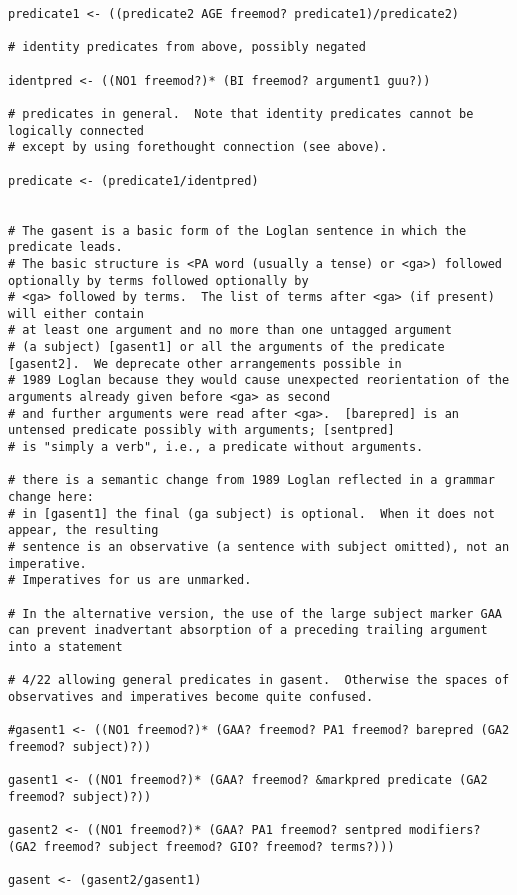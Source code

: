 \documentclass[12pt]{book}
\begin{document}
{\begin{verbatim}
predicate1 <- ((predicate2 AGE freemod? predicate1)/predicate2)

# identity predicates from above, possibly negated

identpred <- ((NO1 freemod?)* (BI freemod? argument1 guu?))

# predicates in general.  Note that identity predicates cannot be logically connected
# except by using forethought connection (see above).

predicate <- (predicate1/identpred)


# The gasent is a basic form of the Loglan sentence in which the predicate leads.
# The basic structure is <PA word (usually a tense) or <ga>) followed optionally by terms followed optionally by
# <ga> followed by terms.  The list of terms after <ga> (if present) will either contain 
# at least one argument and no more than one untagged argument
# (a subject) [gasent1] or all the arguments of the predicate [gasent2].  We deprecate other arrangements possible in
# 1989 Loglan because they would cause unexpected reorientation of the arguments already given before <ga> as second
# and further arguments were read after <ga>.  [barepred] is an untensed predicate possibly with arguments; [sentpred]
# is "simply a verb", i.e., a predicate without arguments.

# there is a semantic change from 1989 Loglan reflected in a grammar change here:
# in [gasent1] the final (ga subject) is optional.  When it does not appear, the resulting
# sentence is an observative (a sentence with subject omitted), not an imperative.
# Imperatives for us are unmarked.

# In the alternative version, the use of the large subject marker GAA can prevent inadvertant absorption of a preceding trailing argument into a statement

# 4/22 allowing general predicates in gasent.  Otherwise the spaces of observatives and imperatives become quite confused.

#gasent1 <- ((NO1 freemod?)* (GAA? freemod? PA1 freemod? barepred (GA2 freemod? subject)?))

gasent1 <- ((NO1 freemod?)* (GAA? freemod? &markpred predicate (GA2 freemod? subject)?))

gasent2 <- ((NO1 freemod?)* (GAA? PA1 freemod? sentpred modifiers? (GA2 freemod? subject freemod? GIO? freemod? terms?)))

gasent <- (gasent2/gasent1)


\end{verbatim}}
\end{document}
